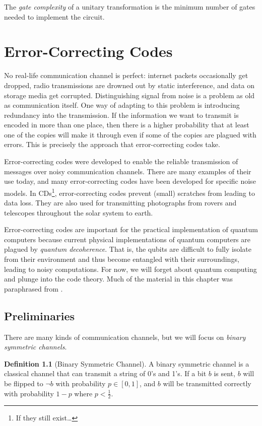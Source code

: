 \documentclass[12pt,twoside]{reedthesis}
\theoremstyle{definition}
\newtheorem{definition}[theorem]{Definition}
\begin{document}
The \textit{gate complexity} of a unitary transformation is the minimum number of gates needed to implement the circuit. 




\chapter{Error-Correcting Codes}	

No real-life communication channel is perfect: internet packets occasionally get dropped, radio transmissions are drowned out by static interference, and data on storage media get corrupted. Distinguishing signal from noise is a problem as old as communication itself. One way of adapting to this problem is introducing redundancy into the transmission. If the information we want to transmit is encoded in more than one place, then there is a higher probability that at least one of the copies will make it through even if some of the copies are plagued with errors. This is precisely the approach that error-correcting codes take. 


Error-correcting codes were developed to enable the reliable transmission of messages over noisy communication channels. There are many examples of their use today, and many error-correcting codes have been developed for specific noise models. In CDs\footnote{If they still exist\ldots}, error-correcting codes prevent (small) scratches from leading to data loss. They are also used for transmitting photographs from rovers and telescopes throughout the solar system to earth. 

Error-correcting codes are important for the practical implementation of quantum computers because current physical implementations of quantum computers are plagued by \textit{quantum decoherence}. That is, the qubits are difficult to fully isolate from their environment and thus become entangled with their surroundings, leading to noisy computations. For now, we will forget about quantum computing and plunge into the code theory. Much of the material in this chapter was paraphrased from \cite{macwilliamssloane}.

\section{Preliminaries}
There are many kinds of communication channels, but we will focus on \textit{binary symmetric channels}. 

\begin{definition}[Binary Symmetric Channel] A binary symmetric channel is a classical channel that can transmit a string of 0's and 1's. If a bit $b$ is sent, $b$ will be flipped to $\lnot b$ with probability $p \in [0,1]$, and $b$ will be transmitted correctly with probability $1-p$ where $p < \frac{1}{2}$.
\end{definition}
\end{document}
